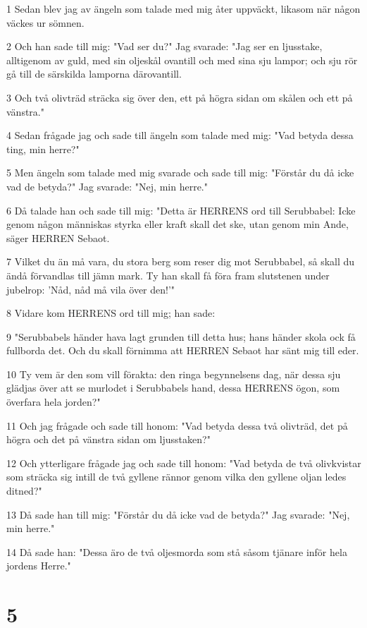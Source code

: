 \par 1 Sedan blev jag av ängeln som talade med mig åter uppväckt, likasom när någon väckes ur sömnen.
\par 2 Och han sade till mig: "Vad ser du?" Jag svarade: "Jag ser en ljusstake, alltigenom av guld, med sin oljeskål ovantill och med sina sju lampor; och sju rör gå till de särskilda lamporna därovantill.
\par 3 Och två olivträd sträcka sig över den, ett på högra sidan om skålen och ett på vänstra."
\par 4 Sedan frågade jag och sade till ängeln som talade med mig: "Vad betyda dessa ting, min herre?"
\par 5 Men ängeln som talade med mig svarade och sade till mig: "Förstår du då icke vad de betyda?" Jag svarade: "Nej, min herre."
\par 6 Då talade han och sade till mig: "Detta är HERRENS ord till Serubbabel: Icke genom någon människas styrka eller kraft skall det ske, utan genom min Ande, säger HERREN Sebaot.
\par 7 Vilket du än må vara, du stora berg som reser dig mot Serubbabel, så skall du ändå förvandlas till jämn mark. Ty han skall få föra fram slutstenen under jubelrop: 'Nåd, nåd må vila över den!'"
\par 8 Vidare kom HERRENS ord till mig; han sade:
\par 9 "Serubbabels händer hava lagt grunden till detta hus; hans händer skola ock få fullborda det. Och du skall förnimma att HERREN Sebaot har sänt mig till eder.
\par 10 Ty vem är den som vill förakta: den ringa begynnelsens dag, när dessa sju glädjas över att se murlodet i Serubbabels hand, dessa HERRENS ögon, som överfara hela jorden?"
\par 11 Och jag frågade och sade till honom: "Vad betyda dessa två olivträd, det på högra och det på vänstra sidan om ljusstaken?"
\par 12 Och ytterligare frågade jag och sade till honom: "Vad betyda de två olivkvistar som sträcka sig intill de två gyllene rännor genom vilka den gyllene oljan ledes ditned?"
\par 13 Då sade han till mig: "Förstår du då icke vad de betyda?" Jag svarade: "Nej, min herre."
\par 14 Då sade han: "Dessa äro de två oljesmorda som stå såsom tjänare inför hela jordens Herre."

\chapter{5}

